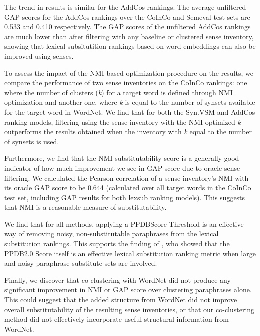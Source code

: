 \documentclass[11pt]{article}
\begin{document}
The trend in results is similar for the AddCos rankings. The average unfiltered GAP scores for the AddCos rankings over the CoInCo and Semeval test sets are 0.533 and 0.410 respectively. The GAP scores of the unfiltered AddCos rankings are much lower than after filtering with any baseline or clustered sense inventory, showing that lexical subsitutition rankings based on word-embeddings can also be improved using senses. 

To assess the impact of the NMI-based optimization procedure on the results, we compare the performance of two sense inventories on the CoInCo rankings: one where the number of clusters (\textit{k}) for a target word is defined through NMI optimization  and another one, where \textit{k} is equal to the number of synsets available for the target word in WordNet. We find that for both the Syn.VSM and AddCos ranking models, filtering using the sense inventory with the NMI-optimized \textit{k} outperforms the results obtained when the inventory with \textit{k} equal to the number of  synsets is used. 

Furthermore, we find that the NMI substitutability score is a generally good indicator of how much improvement we see in GAP score due to oracle sense filtering. We calculated the Pearson correlation of a sense inventory's NMI with its oracle GAP score to be 0.644 (calculated over all target words in the CoInCo test set, including GAP results for both lexsub ranking models). This suggests that NMI is a reasonable measure of substitutability.


We find that for all methods, applying a PPDBScore Threshold is an effective way of removing noisy, non-substitutable paraphrases from the lexical substitution rankings. This supports the finding of , who showed that the PPDB2.0 Score itself is an effective lexical substitution ranking metric when large and noisy paraphrase substitute sets are involved.

Finally, we discover that co-clustering with WordNet did not produce any significant improvement in NMI or GAP score over clustering paraphrases alone. This could suggest that the added structure from WordNet did not improve overall substitutability of the resulting sense inventories, or that our co-clustering method did not effectively incorporate useful structural information from WordNet.
\end{document}
